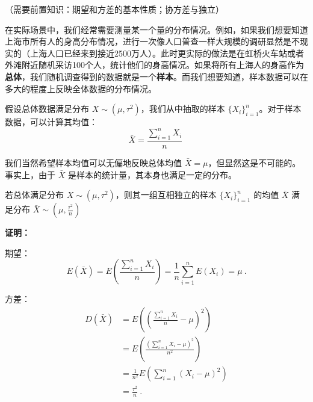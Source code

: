 
\begin{issues}
\issueDraft
\issueMissDepend
\end{issues}
（需要前置知识：期望和方差的基本性质；协方差与独立）

在实际场景中，我们经常需要测量某一个量的分布情况。例如，如果我们想要知道上海市所有人的身高分布情况，进行一次像人口普查一样大规模的调研显然是不现实的（上海人口已经来到接近2500万人）。此时更实际的做法是在虹桥火车站或者外滩附近随机采访100个人，统计他们的身高情况。如果将所有上海人的身高作为\textbf{总体}，我们随机调查得到的数据就是一个\textbf{样本}。而我们想要知道，样本数据可以在多大的程度上反映全体数据的分布情况。

假设总体数据满足分布 $X\sim(\mu, \tau^2)$，我们从中抽取的样本 $\{X_i \}_{i=1}^n$。对于样本数据，可以计算其均值：\begin{equation}
\bar X=\frac{\sum_{i=1}^n X_i}{n}~
\end{equation}

我们当然希望样本均值可以无偏地反映总体均值 $\bar X=\mu$，但显然这是不可能的。事实上，由于 $\bar X$ 是样本的统计量，其本身也满足一定的分布。

\begin{theorem}{}
若总体满足分布 $X\sim (\mu, \tau^2)$，则其一组互相独立的样本 $\{X_i \}_{i=1}^n$ 的均值 $\bar X$ 满足分布 $\bar X\sim (\mu, \frac{\tau^2}{n})$
\end{theorem}
\textbf{证明：}

期望：
\begin{equation}
E(\bar X) =E(\frac{\sum_{i=1}^n X_i}{n}) 
        =\frac 1 n \sum_{i=1}^n E(X_i)=\mu~.
\end{equation}

方差：
\begin{equation}
\begin{aligned}
D(\bar X) &=E((\frac{\sum_{i=1}^n X_i}{n}-\mu)^2)\\
&= E(\frac{(\sum_{i=1}^n X_i-\mu)^2}{n^2}) \\
&=\frac {1} {n^2} E(\sum_{i=1}^n (X_i-\mu)^2) \\
&=\frac {\tau^2}{n}~.
\end{aligned}
\end{equation}

